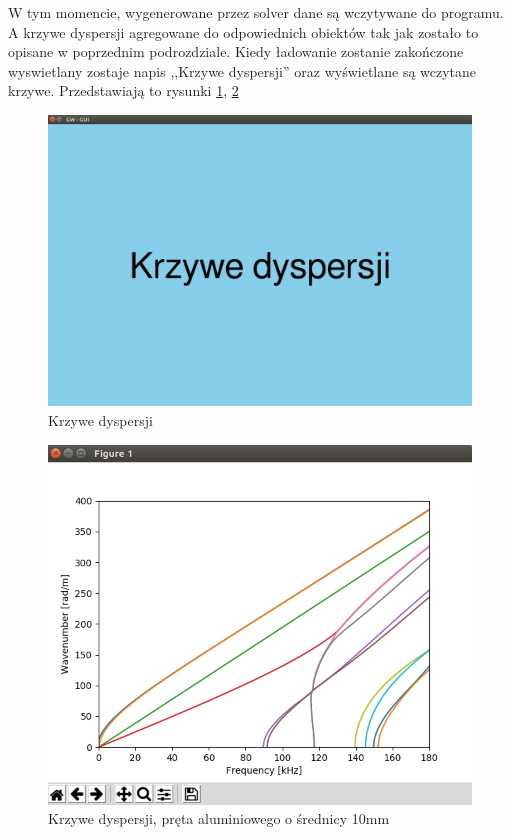W tym momencie, wygenerowane przez solver dane są wczytywane do programu. A krzywe dyspersji agregowane do odpowiednich obiektów tak jak zostało to opisane w poprzednim podrozdziale. Kiedy ładowanie zostanie zakończone wyswietlany zostaje napis ,,Krzywe dyspersji'' oraz wyświetlane są wczytane krzywe. Przedstawiają to rysunki \ref{fig:gui3}, \ref{fig:gui4} 

\begin{figure}[h]
\centering
\includegraphics[width=13cm]{Zdjecia/5/kasia/gui3}
\caption{Krzywe dyspersji}
\label{fig:gui3}
\end{figure}

\begin{figure}[h]
\centering
\includegraphics[width=13cm]{Zdjecia/5/kasia/gui4}
\caption{Krzywe dyspersji, pręta aluminiowego o średnicy 10mm}
\label{fig:gui4}
\end{figure}

